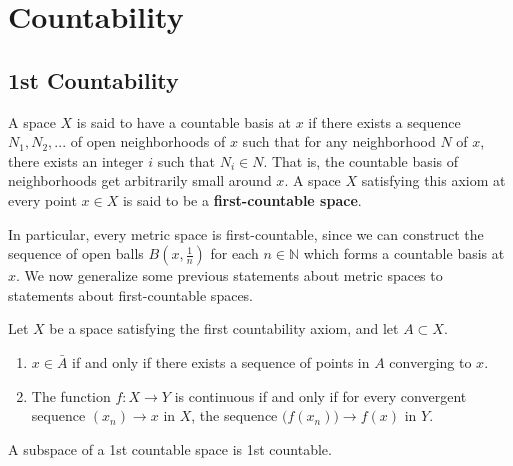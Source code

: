 \section{Countability}

\subsection{1st Countability}

  \begin{definition}[1st-Countability]
    \label{def:1st-countability}
    A space $X$ is said to have a countable basis at $x$ if there exists a sequence $N_1, N_2, ...$ of open neighborhoods of $x$ such that for any neighborhood $N$ of $x$, there exists an integer $i$ such that $N_i \in N$. That is, the countable basis of neighborhoods get arbitrarily small around $x$. A space $X$ satisfying this axiom at every point $x \in X$ is said to be a \textbf{first-countable space}. 
  \end{definition}

  In particular, every metric space is first-countable, since we can construct the sequence of open balls $B (x, \frac{1}{n})$ for each $n \in \mathbb{N}$ which forms a countable basis at $x$. We now generalize some previous statements about metric spaces to statements about first-countable spaces. 

  \begin{theorem}
    \label{thm:sequence-characterizations-in-first-countable}
    Let $X$ be a space satisfying the first countability axiom, and let $A \subset X$. 
    \begin{enumerate}
      \item $x \in \bar{A}$ if and only if there exists a sequence of points in $A$ converging to $x$. 
      \item The function $f: X \to Y$ is continuous if and only if for every convergent sequence $(x_n) \rightarrow x$ in $X$, the sequence $\big( f(x_n)\big) \rightarrow f(x)$ in $Y$. 
    \end{enumerate}
  \end{theorem}

  \begin{theorem}[Subspace]
    \label{thm:subspace}
    A subspace of a 1st countable space is 1st countable. 
  \end{theorem}

  \begin{theorem}
    \label{thm:finite-products-2}
    
  \end{theorem}


